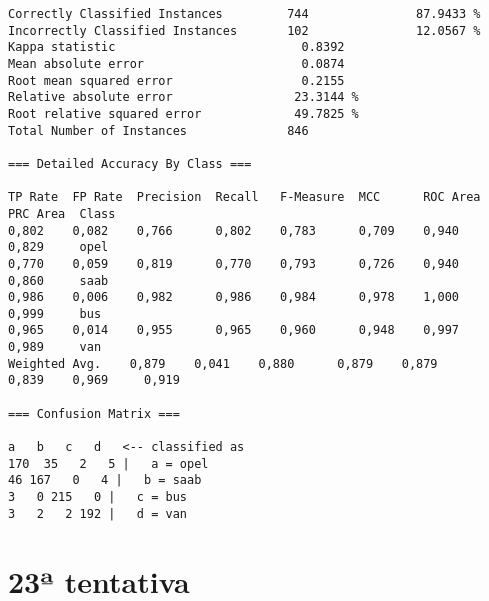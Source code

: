 \documentclass[
	article,			%
	11pt,				%
	oneside,			%
	a4paper,			%
	english,			%
	brazil,				%
	sumario=tradicional
	]{abntex2}
\begin{document}
\begin{lstlisting}
Correctly Classified Instances         744               87.9433 %
Incorrectly Classified Instances       102               12.0567 %
Kappa statistic                          0.8392
Mean absolute error                      0.0874
Root mean squared error                  0.2155
Relative absolute error                 23.3144 %
Root relative squared error             49.7825 %
Total Number of Instances              846     

=== Detailed Accuracy By Class ===

TP Rate  FP Rate  Precision  Recall   F-Measure  MCC      ROC Area  PRC Area  Class
0,802    0,082    0,766      0,802    0,783      0,709    0,940     0,829     opel
0,770    0,059    0,819      0,770    0,793      0,726    0,940     0,860     saab
0,986    0,006    0,982      0,986    0,984      0,978    1,000     0,999     bus
0,965    0,014    0,955      0,965    0,960      0,948    0,997     0,989     van
Weighted Avg.    0,879    0,041    0,880      0,879    0,879      0,839    0,969     0,919     

=== Confusion Matrix ===

a   b   c   d   <-- classified as
170  35   2   5 |   a = opel
46 167   0   4 |   b = saab
3   0 215   0 |   c = bus
3   2   2 192 |   d = van

\end{lstlisting}

\newpage

\section{23ª tentativa}
\end{document}
